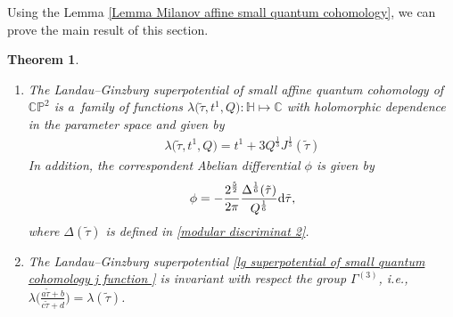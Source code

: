\documentclass[11pt]{article}
\numberwithin{equation}{section}
\numberwithin{equation}{section}
\newtheorem{Theorem}{Theorem}[section]
\begin{document}
Using the Lemma \ref{Lemma Milanov affine small quantum cohomology}, we can prove the main result of this section.

\begin{Theorem}\quad
\begin{enumerate}\itemsep=0pt
\item[$(1)$]
The Landau--Ginzburg superpotential of small affine quantum cohomology of $\mathbb{CP}^2$ is a~family of functions
$
\lambda\bigl(\tilde\tau, t^1, Q\bigr)\colon \mathbb{H} \mapsto \mathbb{C}
$
with holomorphic dependence in the parameter space 
 and given by
\begin{gather}\label{lg superpotential of small quantum cohomology j function }
\lambda\bigl(\tilde\tau, t^1, Q\bigr)=t^1+3Q^{\frac{1}{3}}J^{\frac{1}{3}}(\tilde\tau)
\end{gather}
 In addition, the correspondent Abelian differential $\phi$ is given by
\begin{gather}\label{small volume form 1}
\phi=-\frac{2^{\frac{5}{2}}}{2\pi}\frac{\Delta^{\frac{1}{6}}(\tilde\tau )}{Q^{\frac{1}{6}}}{\rm d}\tilde\tau,
\end{gather}
where $\Delta(\tilde\tau)$ is defined in \eqref{modular discriminat 2}.

\item[$(2)$] The Landau--Ginzburg superpotential \eqref{lg superpotential of small quantum cohomology j function } is invariant with respect the group $\Gamma^{(3)}$, i.e.,
$
\lambda\bigl(\frac{a\tilde\tau+b}{c\tilde\tau+d}\bigr)=\lambda(\tilde\tau)$.
\end{enumerate}
\end{Theorem}
\end{document}
